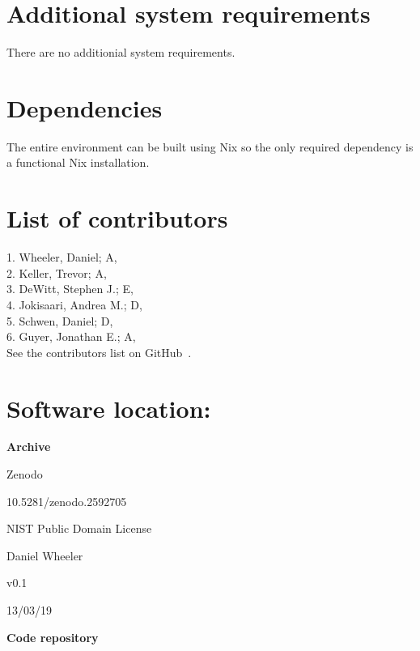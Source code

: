 \documentclass{jors}
\begin{document}
\section*{Additional system requirements}

There are no additionial system requirements.

\section*{Dependencies}

The entire environment can be built using Nix so the only required
dependency is a functional Nix installation.

\section*{List of contributors}

1. Wheeler, Daniel; A,  \\
2. Keller, Trevor; A,  \\
3. DeWitt, Stephen J.; E,  \\
4. Jokisaari, Andrea M.; D,  \\
5. Schwen, Daniel; D,  \\
6. Guyer, Jonathan E.; A,  \\

See the contributors list on GitHub~\cite{contributors}.

\section*{Software location:}

{\bf Archive}

\begin{description}[noitemsep,topsep=0pt]
	\item[Name:] Zenodo
	\item[Persistent identifier:] 10.5281/zenodo.2592705
	\item[Licence:] NIST Public Domain License~\cite{nistlicense}
	\item[Publisher:]  Daniel Wheeler
	\item[Version published:] v0.1
	\item[Date published:] 13/03/19
\end{description}


{\bf Code repository}
\end{document}
